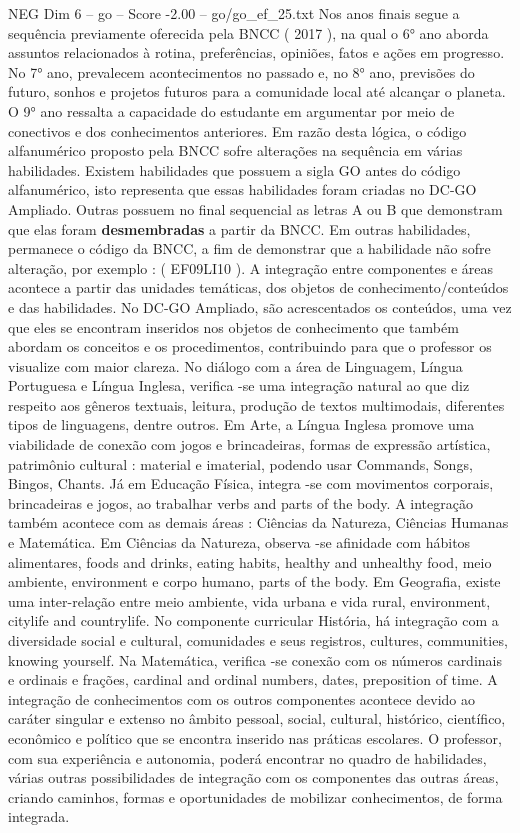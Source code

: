\begin{textsample}{NEG Dim 6 – go – Score -2.00 – go/go\_ef\_25.txt}
Nos anos finais segue a sequência previamente oferecida pela BNCC ( 2017 ), na qual o 6{\EmojiFont °} ano aborda assuntos relacionados à rotina, preferências, opiniões, fatos e ações em progresso.
No 7{\EmojiFont °} ano, prevalecem acontecimentos no passado e, no 8{\EmojiFont °} ano, previsões do futuro, sonhos e projetos futuros para a comunidade local até alcançar o planeta.
O 9{\EmojiFont °} ano ressalta a capacidade do estudante em argumentar por meio de conectivos e dos conhecimentos anteriores.
Em razão desta lógica, o código alfanumérico proposto pela BNCC sofre alterações na sequência em várias habilidades.
Existem habilidades que possuem a sigla GO antes do código alfanumérico, isto representa que essas habilidades foram criadas no DC-GO Ampliado.
Outras possuem no final sequencial as letras A ou B que demonstram que elas foram \textbf{desmembradas} a partir da BNCC.
Em outras habilidades, permanece o código da BNCC, a fim de demonstrar que a habilidade não sofre alteração, por exemplo : ( EF09LI10 ).
A integração entre componentes e áreas acontece a partir das unidades temáticas, dos objetos de conhecimento/conteúdos e das habilidades.
No DC-GO Ampliado, são acrescentados os conteúdos, uma vez que eles se encontram inseridos nos objetos de conhecimento que também abordam os conceitos e os procedimentos, contribuindo para que o professor os visualize com maior clareza.
No diálogo com a área de Linguagem, Língua Portuguesa e Língua Inglesa, verifica -se uma integração natural ao que diz respeito aos gêneros textuais, leitura, produção de textos multimodais, diferentes tipos de linguagens, dentre outros.
Em Arte, a Língua Inglesa promove uma viabilidade de conexão com jogos e brincadeiras, formas de expressão artística, patrimônio cultural : material e imaterial, podendo usar Commands, Songs, Bingos, Chants.
Já em Educação Física, integra -se com movimentos corporais, brincadeiras e jogos, ao trabalhar verbs and parts of the body.
A integração também acontece com as demais áreas : Ciências da Natureza, Ciências Humanas e Matemática.
Em Ciências da Natureza, observa -se afinidade com hábitos alimentares, foods and drinks, eating habits, healthy and unhealthy food, meio ambiente, environment e corpo humano, parts of the body.
Em Geografia, existe uma inter-relação entre meio ambiente, vida urbana e vida rural, environment, citylife and countrylife.
No componente curricular História, há integração com a diversidade social e cultural, comunidades e seus registros, cultures, communities, knowing yourself.
Na Matemática, verifica -se conexão com os números cardinais e ordinais e frações, cardinal and ordinal numbers, dates, preposition of time.
A integração de conhecimentos com os outros componentes acontece devido ao caráter singular e extenso no âmbito pessoal, social, cultural, histórico, científico, econômico e político que se encontra inserido nas práticas escolares.
O professor, com sua experiência e autonomia, poderá encontrar no quadro de habilidades, várias outras possibilidades de integração com os componentes das outras áreas, criando caminhos, formas e oportunidades de mobilizar conhecimentos, de forma integrada.

\end{textsample}
